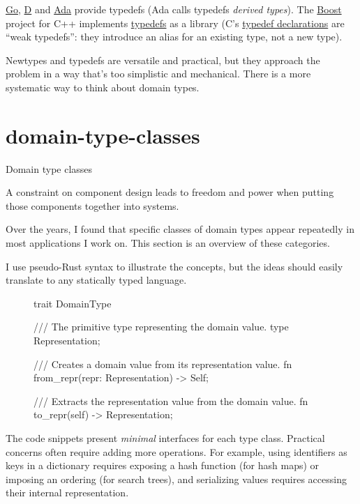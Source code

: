 \documentclass{article}
\begin{document}
\href{https://go.dev/ref/spec#Type_definitions}{Go}, \href{https://dlang.org/library/std/typecons/typedef.html}{D} and \href{https://en.wikibooks.org/wiki/Ada_Programming/Type_System#Derived_types}{Ada} provide typedefs (Ada calls typedefs \emph{derived types}).
The \href{https://www.boost.org/}{Boost} project for C++ implements \href{https://www.boost.org/doc/libs/1_61_0/libs/serialization/doc/strong_typedef.html}{typedefs} as a library
(C's \href{https://en.cppreference.com/w/c/language/typedef}{typedef declarations} are ``weak typedefs'': they introduce an alias for an existing type, not a new type).

Newtypes and typedefs are versatile and practical, but they approach the problem in a way that's too simplistic and mechanical.
There is a more systematic way to think about domain types.

\section{domain-type-classes}{Domain type classes}

\epigraph{A constraint on component design leads to freedom and power when putting those components together into systems.}{}

Over the years, I found that specific classes of domain types appear repeatedly in most applications I work on.
This section is an overview of these categories.

I use pseudo-Rust syntax to illustrate the concepts, but the ideas should easily translate to any statically typed language.

\begin{figure}
\begin{code}[rust]
trait DomainType {
  /// The primitive type representing the domain value.
  type Representation; \label{representation-type}

  /// Creates a domain value from its representation value.
  fn from_repr(repr: Representation) -> Self;

  /// Extracts the representation value from the domain value.
  fn to_repr(self) -> Representation;
}
\end{code}
\end{figure}

The code snippets present \emph{minimal} interfaces for each type class.
Practical concerns often require adding more operations.
For example, using identifiers as keys in a dictionary requires exposing a hash function (for hash maps) or imposing an ordering (for search trees), and serializing values requires accessing their internal representation.
\end{document}
